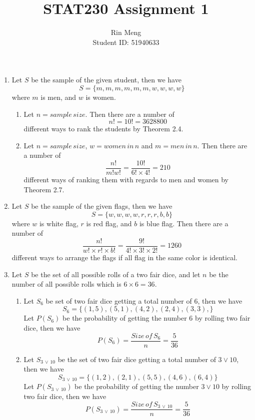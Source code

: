 \documentclass[12pt]{article}
\begin{document}
\title{STAT230 Assignment 1}
\author{Rin Meng \\ Student ID: 51940633}
\maketitle	

\begin{enumerate}
	\item Let $S$ be the sample of the given student, then we have
		$$S = \{m, m, m, m, m, m, w, w, w, w\}$$
		where $m$ is men, and $w$ is women.
		
	\begin{enumerate}
		\item Let $n = sample \, size$. Then there are a number of
		$$n! = 10! = 3628800$$
		different ways to rank the students by Theorem 2.4.
		
		\item Let $n = sample \, size$, $w = women \, in \, n$ and $m = men \, in \, n$. Then there are a number of 
		$$\frac{n!}{m!w!} = \frac{10!}{6! \times 4!} = 210$$
		different ways of ranking them with regards to men and women
		by Theorem 2.7.
	\end{enumerate}
	
	\item Let $S$ be the sample of the given flags, then we have
	$$S = \{w, w, w, w, r, r, r, b, b\}$$
	where $w$ is white flag, $r$ is red flag, and $b$ is blue flag. Then there are a number of 
	$$\frac{n!}{w! \times r! \times b!} = \frac{9!}{4! \times 3! \times 2!} = 1260$$
	different ways to arrange the flags if all flag in the same color is identical.
	
	\item Let $S$ be the set of all possible rolls of a two fair dice, and let $n$ be the number of all possible rolls which is $6 \times 6 = 36$.
	
	\begin{enumerate}
	
		\item Let $S_6$ be set of two fair dice getting a total number of 6, then we have
		$$S_6 = \{(1,5), (5,1), (4,2), (2,4), (3,3),\}$$
		Let $P(S_6)$ be the probability of getting the number 6 by rolling two fair dice, then we have
		$$P(S_6) = \frac{Size \, of \, S_6}{n} = \frac{5}{36}$$
		
		\item Let $S_{3 \, \lor \, 10}$ be the set of two fair dice getting a total number of $3 \lor 10$, then we have
		$$S_{3 \, \lor \, 10} = \{(1,2), (2,1), (5,5), (4,6), (6,4)\}$$
		Let $P(S_{3 \, \lor \, 10})$ be the probability of getting the number $3 \lor 10$ by rolling two fair dice, then we have
		$$P(S_{3 \, \lor \, 10}) = \frac{Size \, of \, S_{3 \, \lor \, 10}}{n} = \frac{5}{36}$$
		

\end{enumerate}
\end{enumerate}
\end{document}
